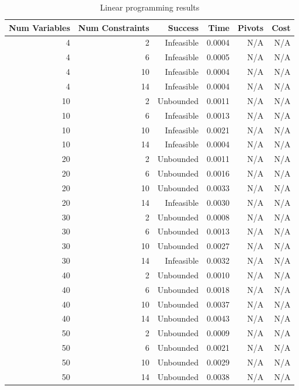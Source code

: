 \begin{table}[ht]
    \centering
    \begin{tabular}{rrrrrr}
        \toprule
        Num Variables & Num Constraints & Success & Time & Pivots & Cost \\
        \midrule
        4 & 2 & Infeasible & 0.0004 & N/A & N/A \\
		4 & 6 & Infeasible & 0.0005 & N/A & N/A \\
		4 & 10 & Infeasible & 0.0004 & N/A & N/A \\
		4 & 14 & Infeasible & 0.0004 & N/A & N/A \\
		10 & 2 & Unbounded & 0.0011 & N/A & N/A \\
		10 & 6 & Infeasible & 0.0013 & N/A & N/A \\
		10 & 10 & Infeasible & 0.0021 & N/A & N/A \\
		10 & 14 & Infeasible & 0.0004 & N/A & N/A \\
		20 & 2 & Unbounded & 0.0011 & N/A & N/A \\
		20 & 6 & Unbounded & 0.0016 & N/A & N/A \\
		20 & 10 & Unbounded & 0.0033 & N/A & N/A \\
		20 & 14 & Infeasible & 0.0030 & N/A & N/A \\
		30 & 2 & Unbounded & 0.0008 & N/A & N/A \\
		30 & 6 & Unbounded & 0.0013 & N/A & N/A \\
		30 & 10 & Unbounded & 0.0027 & N/A & N/A \\
		30 & 14 & Infeasible & 0.0032 & N/A & N/A \\
		40 & 2 & Unbounded & 0.0010 & N/A & N/A \\
		40 & 6 & Unbounded & 0.0018 & N/A & N/A \\
		40 & 10 & Unbounded & 0.0037 & N/A & N/A \\
		40 & 14 & Unbounded & 0.0043 & N/A & N/A \\
		50 & 2 & Unbounded & 0.0009 & N/A & N/A \\
		50 & 6 & Unbounded & 0.0021 & N/A & N/A \\
		50 & 10 & Unbounded & 0.0029 & N/A & N/A \\
		50 & 14 & Unbounded & 0.0038 & N/A & N/A \\
        \bottomrule
    \end{tabular}
    \caption{Linear programming results}
    \label{tab:lp-results}
\end{table}